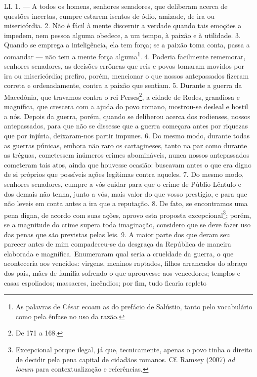 LI. 1. --- A todos os homens, senhores senadores, que deliberam acerca de
questões incertas, cumpre estarem isentos de ódio, amizade, de ira ou
misericórdia. 2. Não é fácil à mente discernir a verdade quando tais emoções a
impedem, nem pessoa alguma obedece, a um tempo, à paixão e à utilidade. 3.
Quando se emprega a inteligência, ela tem força; se a paixão toma conta, passa
a comandar --- não tem a mente força alguma\footnote{As palavras de César ecoam
as do prefácio de Salústio, tanto pelo vocabulário como pela ênfase no uso da
razão.}. 4. Poderia facilmente rememorar, senhores senadores, as decisões
errôneas que reis e povos tomaram movidos por ira ou misericórdia; prefiro,
porém, mencionar o que nossos antepassados fizeram correta e ordenadamente,
contra a paixão que sentiam. 5. Durante a guerra da Macedônia, que travamos
contra o rei Perses\footnote{De 171 a 168.}, a cidade de Rodes, grandiosa e
magnífica, que crescera com a ajuda do povo romano, mostrou-se desleal e hostil
a nós. Depois da guerra, porém, quando se deliberou acerca dos rodienses,
nossos antepassados, para que não se dissesse que a guerra começara antes por
riquezas que por injúria, deixaram-nos partir impunes. 6. Do mesmo modo,
durante todas as guerras púnicas, embora não raro os cartagineses, tanto na paz
como durante as tréguas, cometessem inúmeros crimes abomináveis, nunca nossos
antepassados cometeram tais atos, ainda que houvesse ocasião: buscavam antes o
que era digno de si próprios que possíveis ações legítimas contra aqueles. 7.
Do mesmo modo, senhores senadores, cumpre a vós cuidar para que o crime de
Públio Lêntulo e dos demais não tenha, junto a vós, mais valor do que vosso
prestígio, e para que não leveis em conta antes a ira que a reputação. 8. De
fato, se encontramos uma pena digna, de acordo com suas ações, aprovo esta
proposta excepcional\footnote{Excepcional porque ilegal, já que, tecnicamente,
apenas o povo tinha o direito de decidir pela pena capital de cidadãos romanos.
Cf. Ramsey (2007) \emph{ad locum} para contextualização e referências.}; porém,
se a magnitude do crime supera toda imaginação, considero que se deve fazer uso
das penas que são previstas pelas leis. 9. A maior parte dos que deram seu
parecer antes de mim compadeceu-se da desgraça da República de maneira
elaborada e magnífica. Enumeraram qual seria a crueldade da guerra, o que
aconteceria aos vencidos: virgens, meninos raptados, filhos arrancados do
abraço dos pais, mães de família sofrendo o que aprouvesse aos vencedores;
templos e casas espoliados; massacres, incêndios; por fim, tudo ficaria repleto

